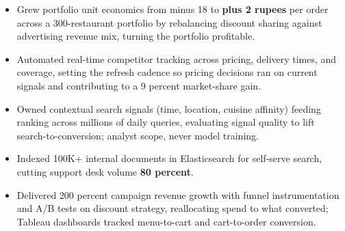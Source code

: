 \documentclass[letterpaper,10pt]{article}
\begin{document}
\begin{itemize}
\item Grew portfolio unit economics from minus 18 to \textbf{plus 2 rupees} per order across a 300-restaurant portfolio by rebalancing discount sharing against advertising revenue mix, turning the portfolio profitable.
\item Automated real-time competitor tracking across pricing, delivery times, and coverage, setting the refresh cadence so pricing decisions ran on current signals and contributing to a 9 percent market-share gain.
\item Owned contextual search signals (time, location, cuisine affinity) feeding ranking across millions of daily queries, evaluating signal quality to lift search-to-conversion; analyst scope, never model training.
\item Indexed 100K+ internal documents in Elasticsearch for self-serve search, cutting support desk volume \textbf{80 percent}.
\item Delivered 200 percent campaign revenue growth with funnel instrumentation and A/B tests on discount strategy, reallocating spend to what converted; Tableau dashboards tracked menu-to-cart and cart-to-order conversion.
\end{itemize}
\end{document}
